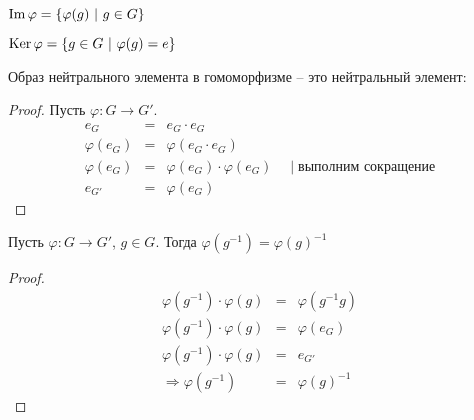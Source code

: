 \begin{conj}
  $\operatorname{Im} {\varphi} = \{ \varphi(g)\ |\ g\in G \}$

  $\operatorname{Ker}{\varphi} = \{ g \in G\ |\ \varphi(g) = e \}$
\end{conj}

\begin{theorem}
  Образ нейтрального элемента в гомоморфизме -- 
  это нейтральный элемент:

  \begin{proof}
    Пусть $\varphi \colon G \to G'$.
    \begin{eqnarray*}
      e_G &=& e_G \cdot e_G \\
      \varphi(e_G) &=& \varphi(e_G \cdot e_G) \\
      \varphi(e_G) &=& \varphi(e_G) \cdot \varphi(e_G)
      \quad \mid \text{выполним сокращение} \\
      e_{G'} &=& \varphi(e_G)
    \end{eqnarray*}
  \end{proof}
\end{theorem}

\begin{theorem}
  Пусть $\varphi \colon G \to G'$, $g \in G$.
  Тогда $\varphi(g^{-1}) = \varphi(g)^{-1}$

  \begin{proof}
    \begin{eqnarray*}
      \varphi(g^{-1}) \cdot \varphi(g) &=& \varphi(g^{-1}g) \\
      \varphi(g^{-1}) \cdot \varphi(g) &=& \varphi(e_G) \\
      \varphi(g^{-1}) \cdot \varphi(g) &=& e_{G'} \\
      \Rightarrow \varphi(g^{-1}) &=& \varphi(g)^{-1}
    \end{eqnarray*}
  \end{proof}
\end{theorem}


